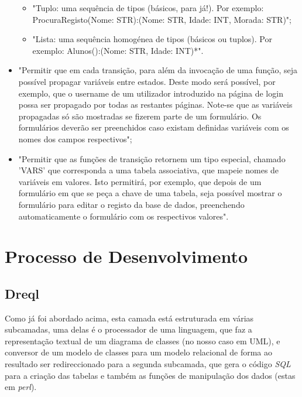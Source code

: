 \documentclass[a4paper]{article}
\begin{document}
\begin{itemize}
\begin{itemize}
\item "Tuplo: uma sequência de tipos (básicos, para já!). Por exemplo: ProcuraRegisto(Nome: STR):(Nome: STR, Idade: INT, Morada: STR)";
\item "Lista: uma sequência homogénea de tipos (básicos ou tuplos). Por exemplo: Alunos():(Nome: STR, Idade: INT)*".
\end{itemize}
\item "Permitir que em cada transição, para além da invocação de uma função, seja possível propagar variáveis entre estados. Deste modo será possível, por exemplo, que o username de um utilizador introduzido na página de login possa ser propagado por todas as restantes páginas. Note-se que as variáveis propagadas só são mostradas se fizerem parte de um formulário. Os formulários deverão ser preenchidos caso existam definidas variáveis com os nomes dos campos respectivos";
\item "Permitir que as funções de transição retornem um tipo especial, chamado 'VARS' que corresponda a uma tabela associativa, que mapeie nomes de variáveis em valores. Isto permitirá, por exemplo, que depois de um formulário em que se peça a chave de uma tabela, seja possível mostrar o formulário para editar o registo da base de dados, preenchendo automaticamente o formulário com os respectivos valores".
\end{itemize}

\newpage

\section{\LARGE Processo de Desenvolvimento}


\subsection{\large Dreql}

\hspace{1cm}Como já foi abordado acima, esta camada está estruturada em várias subcamadas, uma delas é o processador de uma linguagem, que faz a representação textual de um diagrama de classes (no nosso caso em UML), e conversor de um modelo de classes para um modelo relacional de forma ao resultado ser redireccionado para a segunda subcamada, que gera o código {\em SQL} para a criação das tabelas e também as funções de manipulação dos dados (estas em {\em perl}).\\
\end{document}
